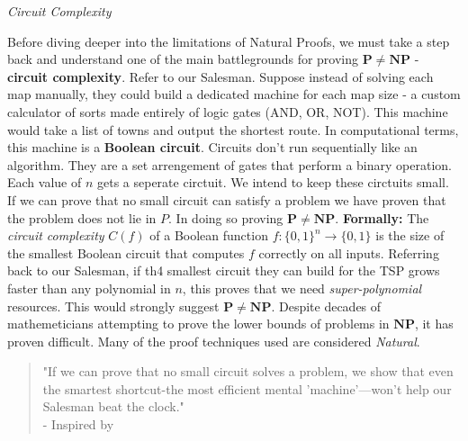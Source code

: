\documentclass[12pt]{report}
\begin{document}
\begin{center}
    \vspace{0cm}
    {\Large\itshape Circuit Complexity\par}
\end{center}
Before diving deeper into the limitations of Natural Proofs, we must take a step back and understand one of the main battlegrounds for proving $\mathbf{P \ne NP}$ - \textbf{circuit complexity}.
Refer to our Salesman.
Suppose instead of solving each map manually, they could build a dedicated machine for each map size - a custom calculator of sorts made entirely of logic gates (AND, OR, NOT).
This machine would take a list of towns and output the shortest route.
In computational terms, this machine is a \textbf{Boolean circuit}.
Circuits don't run sequentially like an algorithm.
They are a set arrengement of gates that perform a binary operation.
Each value of $n$ gets a seperate circtuit.
We intend to keep these circtuits small.
If we can prove that no small circuit can satisfy a problem we have proven that the problem does not lie in $P$.
In doing so proving $\mathbf{P \ne NP}$.
\vspace{0.2cm}
\textbf{Formally:}
The \textit{circuit complexity} $C(f)$ of a Boolean function $f : \{0,1\}^n \rightarrow \{0,1\}$ is the size of the smallest Boolean circuit that computes $f$ correctly on all inputs.
\vspace{0.1cm}
Referring back to our Salesman, if th4 smallest circuit they can build for the TSP grows faster than any polynomial in $n$, this proves that we need \textit{super-polynomial} resources.
This would strongly suggest $\mathbf{P \ne NP}$.
\vspace{0.2cm}
Despite decades of mathemeticians attempting to prove the lower bounds of problems in $\mathbf{NP}$, it has proven difficult.
Many of the proof techniques used are considered \textit{Natural}.
\begin{quote}
    "If we can prove that no small circuit solves a problem, we show that even the smartest shortcut-the most efficient mental 'machine'—won't help our Salesman beat the clock."\\
    - Inspired by  \cite{fortnow2009status}
\end{quote}
\end{document}
